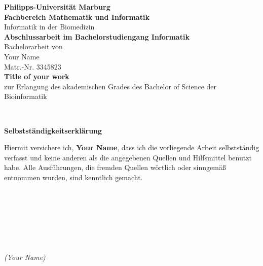 \documentclass[encoding=utf8,german]{scrreprt}
\begin{document}
\mbox{}
\hoffset=5mm
\thispagestyle{empty}

\begin{center}
	\bigskip \bigskip \bigskip 
	\vspace*{0.8cm}
	{\huge \textbf{Philipps-Universität Marburg}} \\
	\bigskip \bigskip \bigskip \bigskip
	{ \textbf{Fachbereich Mathematik und Informatik }} \\
	{{Informatik in der Biomedizin}} \\
	\bigskip \bigskip \bigskip
	{ \textbf{Abschlussarbeit im Bachelorstudiengang Informatik}} \\
	\bigskip \bigskip \bigskip 
	{ Bachelorarbeit von} \\
	\bigskip 
	{\huge Your Name} \\
	\bigskip 
	{ Matr.-Nr. 3345823} \\
	\bigskip \bigskip \bigskip \bigskip
	{ \huge \textbf{Title of your work}} \\
	\bigskip \bigskip
	{{zur Erlangung des akademischen Grades des Bachelor of Science der Bioinformatik}} \\
	\bigskip \bigskip \bigskip \bigskip \bigskip \bigskip \bigskip \bigskip \bigskip
\end{center}

\begin{flushleft}
	 \\

\end{flushleft}

\newpage


\thispagestyle{empty}
\noindent 
\begin{centering}
\huge \textbf{Selbstständigkeitserklärung} \\ 
\end{centering}
\bigskip \bigskip 
\bigskip 
Hiermit versichere ich, \textbf{Your Name}, dass ich die vorliegende Arbeit selbstständig verfasst und keine anderen als die angegebenen Quellen und Hilfsmittel benutzt habe. Alle Ausführungen, die fremden Quellen wörtlich oder sinngemäß entnommen wurden, sind kenntlich gemacht.\\\\
{}\\\\\\\\\\\\
{\noindent \textit{(Your Name)}}
\end{document}
